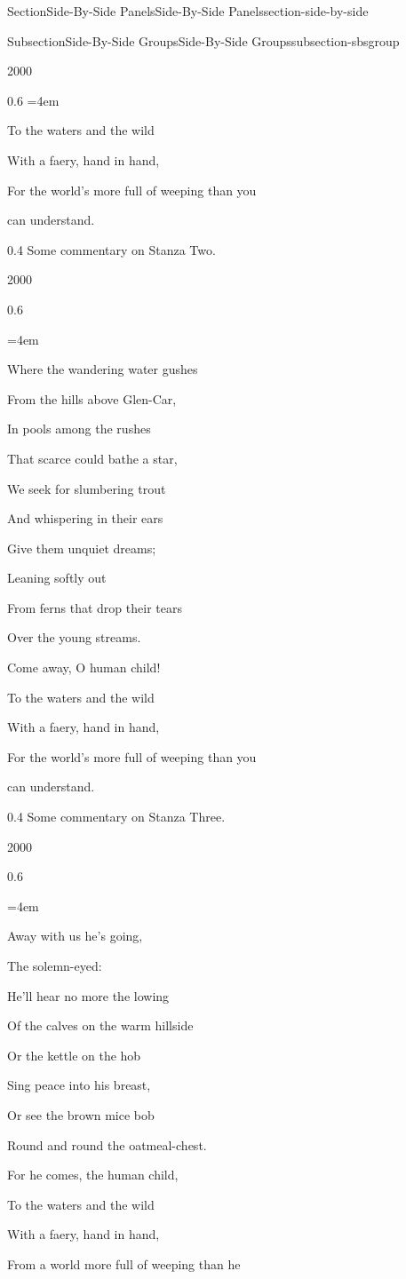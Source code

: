 \documentclass[twoside,10pt,]{article}
\numberwithin{equation}{section}
\newenvironment{poem}{\setlength{\parindent}{0em}}{}
\newcommand{\poemTitle}[1]{\begin{center}\large\textbf{#1}\end{center}}
\newenvironment{stanza}{\vspace{0.25 em}\hangindent=4em}{\vspace{1 em}}
\newcommand{\poemlineleft}[1]{{\raggedright{#1}\par}\vspace{-\parskip}}
\begin{document}
\begin{sectionptx}{Section}{Side-By-Side Panels}{}{Side-By-Side Panels}{}{}{section-side-by-side}
\begin{subsectionptx}{Subsection}{Side-By-Side Groups}{}{Side-By-Side Groups}{}{}{subsection-sbsgroup}
\begin{sidebyside}{2}{0}{0}{0}
\begin{sbspanel}{0.6}
\begin{poem}
\begin{stanza}
\poemlineleft{To the waters and the wild}
\poemlineleft{With a faery, hand in hand,}
\poemlineleft{For the world's more full of weeping than you}
\poemlineleft{can understand.}
\end{stanza}
\end{poem}
\end{sbspanel}%
\begin{sbspanel}{0.4}%
Some commentary on Stanza Two.%
\end{sbspanel}%
\end{sidebyside}%
\begin{sidebyside}{2}{0}{0}{0}%
\begin{sbspanel}{0.6}%
\begin{poem}%
\poemTitle{}
\begin{stanza}
\poemlineleft{Where the wandering water gushes}
\poemlineleft{From the hills above Glen-Car,}
\poemlineleft{In pools among the rushes}
\poemlineleft{That scarce could bathe a star,}
\poemlineleft{We seek for slumbering trout}
\poemlineleft{And whispering in their ears}
\poemlineleft{Give them unquiet dreams;}
\poemlineleft{Leaning softly out}
\poemlineleft{From ferns that drop their tears}
\poemlineleft{Over the young streams.}
\poemlineleft{Come away, O human child!}
\poemlineleft{To the waters and the wild}
\poemlineleft{With a faery, hand in hand,}
\poemlineleft{For the world's more full of weeping than you}
\poemlineleft{can understand.}
\end{stanza}
\end{poem}
\end{sbspanel}%
\begin{sbspanel}{0.4}%
Some commentary on Stanza Three.%
\end{sbspanel}%
\end{sidebyside}%
\begin{sidebyside}{2}{0}{0}{0}%
\begin{sbspanel}{0.6}%
\begin{poem}%
\poemTitle{}
\begin{stanza}
\poemlineleft{Away with us he's going,}
\poemlineleft{The solemn-eyed:}
\poemlineleft{He'll hear no more the lowing}
\poemlineleft{Of the calves on the warm hillside}
\poemlineleft{Or the kettle on the hob}
\poemlineleft{Sing peace into his breast,}
\poemlineleft{Or see the brown mice bob}
\poemlineleft{Round and round the oatmeal-chest.}
\poemlineleft{For he comes, the human child,}
\poemlineleft{To the waters and the wild}
\poemlineleft{With a faery, hand in hand,}
\poemlineleft{From a world more full of weeping than he}

\end{stanza}
\end{poem}
\end{sbspanel}
\end{sidebyside}
\end{subsectionptx}
\end{sectionptx}
\end{document}
